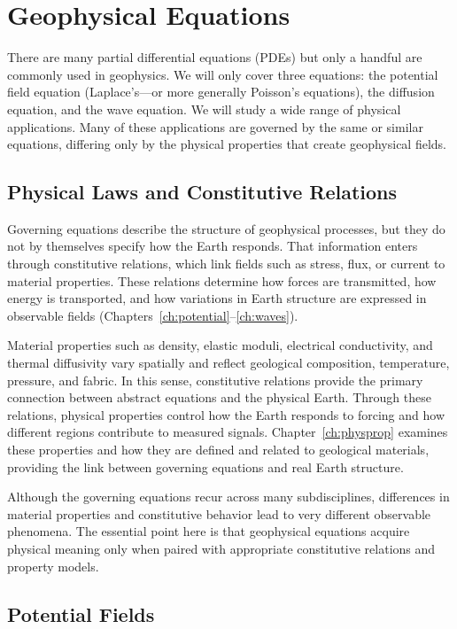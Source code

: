 \section{Geophysical Equations}

There are many partial differential equations (PDEs) but only a handful are commonly used in geophysics.  We will only cover three equations: the potential field equation (Laplace's---or more generally Poisson's equations), the diffusion equation, and the wave equation.  We will study a wide range of physical applications.  Many of these applications are governed by the same or similar equations, differing only by the physical properties that create geophysical fields.

\subsection{Physical Laws and Constitutive Relations}

Governing equations describe the structure of geophysical processes, but they do not by themselves specify how the Earth responds. That information enters through constitutive relations, which link fields such as stress, flux, or current to material properties. These relations determine how forces are transmitted, how energy is transported, and how variations in Earth structure are expressed in observable fields (Chapters~\ref{ch:potential}--\ref{ch:waves}).

Material properties such as density, elastic moduli, electrical conductivity, and thermal diffusivity vary spatially and reflect geological composition, temperature, pressure, and fabric. In this sense, constitutive relations provide the primary connection between abstract equations and the physical Earth. Through these relations, physical properties control how the Earth responds to forcing and how different regions contribute to measured signals. Chapter~\ref{ch:physprop} examines these properties and how they are defined and related to geological materials, providing the link between governing equations and real Earth structure.

Although the governing equations recur across many subdisciplines, differences in material properties and constitutive behavior lead to very different observable phenomena. The essential point here is that geophysical equations acquire physical meaning only when paired with appropriate constitutive relations and property models.

\subsection{Potential Fields} \label{sec:laplace}

